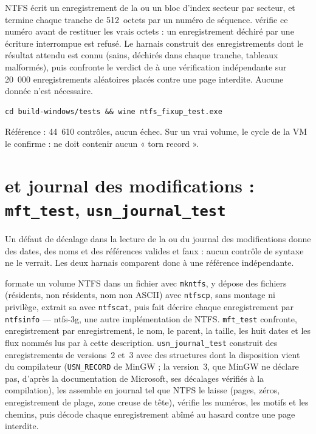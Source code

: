 \documentclass[11pt,a4paper,oneside]{report}
\begin{document}
NTFS écrit un enregistrement de la  ou un bloc d'index
secteur par secteur, et termine chaque tranche de 512~octets par un numéro de
séquence. \wac{} vérifie ce numéro avant de restituer les vrais octets : un
enregistrement déchiré par une écriture interrompue est refusé. Le harnais
construit des enregistrements dont le résultat attendu est connu (sains,
déchirés dans chaque tranche, tableaux malformés), puis confronte le verdict de
\wac{} à une vérification indépendante sur 20~000 enregistrements aléatoires
placés contre une page interdite. Aucune donnée n'est nécessaire.

\begin{lstlisting}
cd build-windows/tests && wine ntfs_fixup_test.exe
\end{lstlisting}

Référence : 44~610 contrôles, aucun échec. Sur un vrai volume, le cycle de la
VM le confirme :  ne doit contenir aucun « torn record ».

\section{ et journal des modifications : \texttt{mft\_test}, \texttt{usn\_journal\_test}}

Un défaut de décalage dans la lecture de la  ou du journal
des modifications donne des dates, des noms et des références valides et
faux : aucun contrôle de syntaxe ne le verrait. Les deux harnais comparent donc
\wac{} à une référence indépendante.

 formate un volume NTFS dans un fichier avec
\texttt{mkntfs}, y dépose des fichiers (résidents, non résidents, nom non
ASCII) avec \texttt{ntfscp}, sans montage ni privilège, extrait sa
 avec \texttt{ntfscat}, puis fait décrire chaque enregistrement
par \texttt{ntfsinfo} — ntfs-3g, une autre implémentation de NTFS.
\texttt{mft\_test} confronte, enregistrement par enregistrement, le nom, le
parent, la taille, les huit dates et les flux nommés lus par \wac{} à cette
description. \texttt{usn\_journal\_test} construit des enregistrements de
versions~2 et~3 avec des structures dont la disposition vient du compilateur
(\texttt{USN\_RECORD} de MinGW ; la version~3, que MinGW ne déclare pas,
d'après la documentation de Microsoft, ses décalages vérifiés à la
compilation), les assemble en journal tel que NTFS le laisse (pages, zéros,
enregistrement de plage, zone creuse de tête), vérifie les numéros, les motifs
et les chemins, puis décode chaque enregistrement abîmé au hasard contre une
page interdite.
\end{document}
